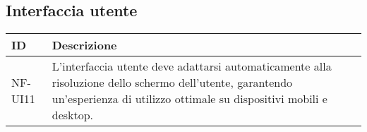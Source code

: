 \subsection*{Interfaccia utente}

\begin{table}[H]
    \centering
    \renewcommand{\arraystretch}{1.3} %
    \begin{tabular}{|p{3cm}|p{10cm}|} 
        \hline
        \textbf{ID} & \textbf{Descrizione} \\  
        \hline
        NF-UI11 & L'interfaccia utente deve adattarsi automaticamente alla risoluzione dello schermo dell’utente, garantendo un’esperienza di utilizzo ottimale su dispositivi mobili e desktop. \\ 
        \hline
    \end{tabular}
\end{table}